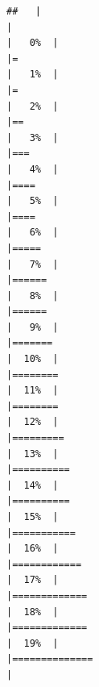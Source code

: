 \documentclass[
]{article}
\begin{document}
\begin{verbatim}
##   |                                                                              |                                                                      |   0%  |                                                                              |=                                                                     |   1%  |                                                                              |=                                                                     |   2%  |                                                                              |==                                                                    |   3%  |                                                                              |===                                                                   |   4%  |                                                                              |====                                                                  |   5%  |                                                                              |====                                                                  |   6%  |                                                                              |=====                                                                 |   7%  |                                                                              |======                                                                |   8%  |                                                                              |======                                                                |   9%  |                                                                              |=======                                                               |  10%  |                                                                              |========                                                              |  11%  |                                                                              |========                                                              |  12%  |                                                                              |=========                                                             |  13%  |                                                                              |==========                                                            |  14%  |                                                                              |==========                                                            |  15%  |                                                                              |===========                                                           |  16%  |                                                                              |============                                                          |  17%  |                                                                              |=============                                                         |  18%  |                                                                              |=============                                                         |  19%  |                                                                              |==============                                                        |  
\end{verbatim}
\end{document}
